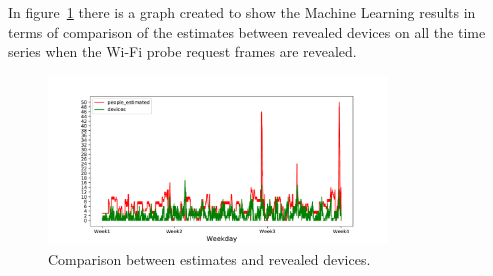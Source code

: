 In figure~\ref{fig:devicespredictions} there is a graph created to show the Machine Learning results in terms of comparison of the estimates between revealed devices on all the time series when the Wi-Fi probe request frames are revealed.

\begin{figure}[h]
\centering 
\includegraphics[width=0.8\textwidth]{images/devicespredictions} 
\caption{Comparison between estimates and revealed devices.}
\label{fig:devicespredictions}
\end{figure}


